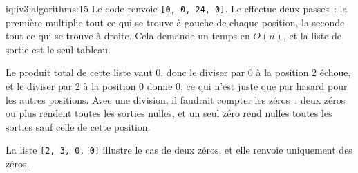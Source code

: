 \begin{solution}{iq:iv3:algorithms:15}
Le code renvoie \texttt{[0, 0, 24, 0]}. Le  effectue deux passes~: la première multiplie tout ce qui se trouve à gauche de chaque position, la seconde tout ce qui se trouve à droite. Cela demande un temps en $O(n)$, et la liste de sortie est le seul tableau.
\label{lst:iv3:al:product}

Le produit total de cette liste vaut 0, donc le diviser par 0 à la position 2 échoue, et le diviser par 2 à la position 0 donne 0, ce qui n'est juste que par hasard pour les autres positions. Avec une division, il faudrait compter les zéros~: deux zéros ou plus rendent toutes les sorties nulles, et un seul zéro rend nulles toutes les sorties sauf celle de cette position.

La liste \texttt{[2, 3, 0, 0]} illustre le cas de deux zéros, et elle renvoie uniquement des zéros.

\end{solution}

